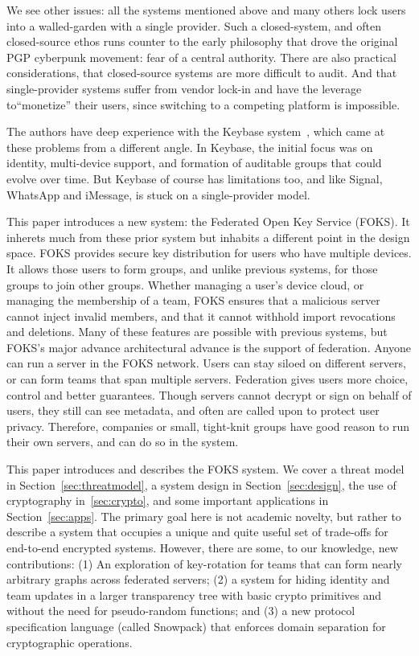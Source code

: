\documentclass[11pt]{article}
\begin{document}
We see other issues: all the systems mentioned above and many others lock users
into a walled-garden with a single provider. Such a closed-system, and often
closed-source ethos runs counter to the early philosophy that drove the original
PGP cyberpunk movement: fear of a central authority.  There are also practical
considerations, that closed-source systems are more difficult to audit. And that
single-provider systems suffer from vendor lock-in and have the leverage
to``monetize'' their users, since switching to a competing platform is
impossible.

The authors have deep experience with the Keybase system~\cite{keybase}, which
came at these problems from a different angle. In Keybase, the initial focus was
on identity, multi-device support, and formation of auditable groups that could
evolve over time. But Keybase of course has limitations too, and like Signal,
WhatsApp and iMessage, is stuck on a single-provider model.

This paper introduces a new system: the Federated Open Key Service (FOKS).  It
inherets much from these prior system but inhabits a different point in the
design space. FOKS provides secure key distribution for users who have multiple
devices. It allows those users to form groups, and unlike previous systems, for
those groups to join other groups. Whether managing a user's device cloud, or
managing the membership of a team, FOKS ensures that a malicious server cannot
inject invalid members, and that it cannot withhold import revocations and
deletions.  Many of these features are possible with previous systems, but
FOKS's major advance architectural advance is the support of federation. Anyone
can run a server in the FOKS network. Users can stay siloed on different
servers, or can form teams that span multiple servers. Federation gives users
more choice, control and better guarantees. Though servers cannot decrypt or
sign on behalf of users, they still can see metadata, and often are called upon
to protect user privacy. Therefore, companies or small, tight-knit groups have
good reason to run their own servers, and can do so in the system.

This paper introduces and describes the FOKS system. We cover a threat model
in Section~\ref{sec:threatmodel}, a system design in Section~\ref{sec:design}, 
the use of cryptography in~\ref{sec:crypto}, and some important applications
in Section~\ref{sec:apps}. The primary goal here is not academic novelty, but
rather to describe a system that occupies a unique
and quite useful set of trade-offs for end-to-end encrypted systems.
However, there are some, to our knowledge, new contributions:
%
(1) An exploration of key-rotation for teams that can form
      nearly arbitrary graphs across federated servers;
%
(2) a system for hiding identity and team updates in a larger
      transparency tree with basic crypto primitives and without the need
      for pseudo-random functions; and
%
(3) a new protocol specification language (called Snowpack) that enforces
  domain separation for cryptographic operations.
\end{document}
